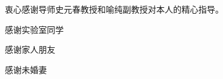 
\begin{acknowledgements}
  衷心感谢导师史元春教授和喻纯副教授对本人的精心指导。

  感谢实验室同学
  
  感谢家人朋友
  
  感谢未婚妻
  
\end{acknowledgements}
